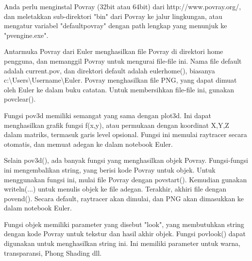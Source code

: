 \documentclass{article}
\begin{document}
\begin{eulernotebook}
\begin{eulercomment}
\begin{eulercomment}
\begin{eulercomment}
\begin{eulercomment}
\begin{eulercomment}
\begin{eulercomment}
\begin{eulercomment}
Anda perlu menginstal Povray (32bit atau 64bit) dari
http://www.povray.org/, dan meletakkan sub-direktori "bin" dari Povray ke jalur lingkungan, atau mengatur variabel "defaultpovray" dengan path lengkap yang menunjuk ke "pvengine.exe".

Antarmuka Povray dari Euler menghasilkan file Povray di direktori home
pengguna, dan memanggil Povray untuk mengurai file-file ini. Nama file
default adalah current.pov, dan direktori default adalah eulerhome(),
biasanya c:\textbackslash{}Users\textbackslash{}Username\textbackslash{}Euler. Povray menghasilkan file PNG, yang
dapat dimuat oleh Euler ke dalam buku catatan. Untuk membersihkan
file-file ini, gunakan povclear().

Fungsi pov3d memiliki semangat yang sama dengan plot3d. Ini dapat
menghasilkan grafik fungsi f(x,y), atau permukaan dengan koordinat
X,Y,Z dalam matriks, termasuk garis level opsional. Fungsi ini memulai
raytracer secara otomatis, dan memuat adegan ke dalam notebook Euler.

Selain pov3d(), ada banyak fungsi yang menghasilkan objek Povray.
Fungsi-fungsi ini mengembalikan string, yang berisi kode Povray untuk
objek. Untuk menggunakan fungsi ini, mulai file Povray dengan
povstart(). Kemudian gunakan writeln(...) untuk menulis objek ke file
adegan. Terakhir, akhiri file dengan povend(). Secara default,
raytracer akan dimulai, dan PNG akan dimasukkan ke dalam notebook
Euler.

Fungsi objek memiliki parameter yang disebut "look", yang membutuhkan
string dengan kode Povray untuk tekstur dan hasil akhir objek. Fungsi
povlook() dapat digunakan untuk menghasilkan string ini. Ini memiliki
parameter untuk warna, transparansi, Phong Shading dll.


\end{eulercomment}
\end{eulercomment}
\end{eulercomment}
\end{eulercomment}
\end{eulercomment}
\end{eulercomment}
\end{eulercomment}
\end{eulernotebook}
\end{document}
